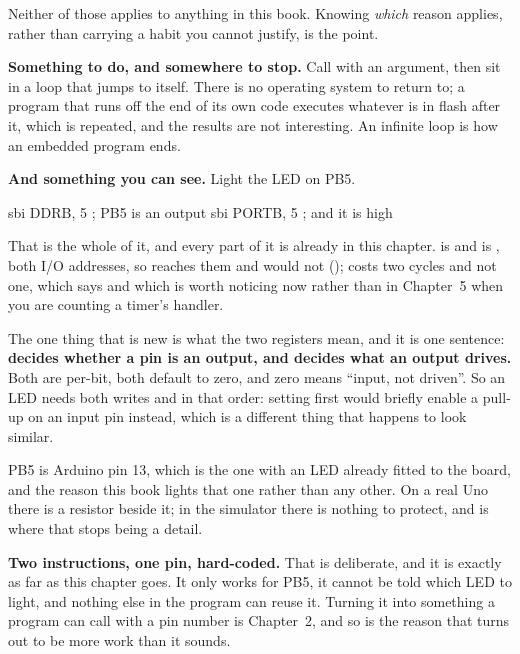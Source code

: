 Neither of those applies to anything in this book. Knowing \emph{which} reason applies, rather
than carrying a habit you cannot justify, is the point.

\textbf{Something to do, and somewhere to stop.} Call  with an argument, then sit
in a loop that jumps to itself. There is no operating system to return to; a program that runs off
the end of its own code executes whatever is in flash after it, which is  repeated, and
the results are not interesting. An infinite loop is how an embedded program ends.

\textbf{And something you can see.} Light the LED on PB5.

\begin{asm}
    sbi  DDRB, 5                ; PB5 is an output
    sbi  PORTB, 5               ; and it is high
\end{asm}

That is the whole of it, and every part of it is already in this chapter.  is
 and  is , both I/O addresses, so  reaches them and
 would not ();  costs two cycles and not one, which
 says and which is worth noticing now rather than in Chapter~5 when you are
counting a timer's handler.

The one thing that is new is what the two registers mean, and it is one sentence:
\textbf{ decides whether a pin is an output, and  decides what an output
drives.} Both are per-bit, both default to zero, and zero means ``input, not driven''. So an LED
needs both writes and in that order: setting  first would briefly enable a pull-up on
an input pin instead, which is a different thing that happens to look similar.

PB5 is Arduino pin 13, which is the one with an LED already fitted to the board, and the reason
this book lights that one rather than any other. On a real Uno there is a resistor beside it; in
the simulator there is nothing to protect, and  is where that stops being a detail.

\textbf{Two instructions, one pin, hard-coded.} That is deliberate, and it is exactly as far as
this chapter goes. It only works for PB5, it cannot be told which LED to light, and nothing else
in the program can reuse it. Turning it into something a program can call with a pin number is
Chapter~2, and so is the reason that turns out to be more work than it sounds.

